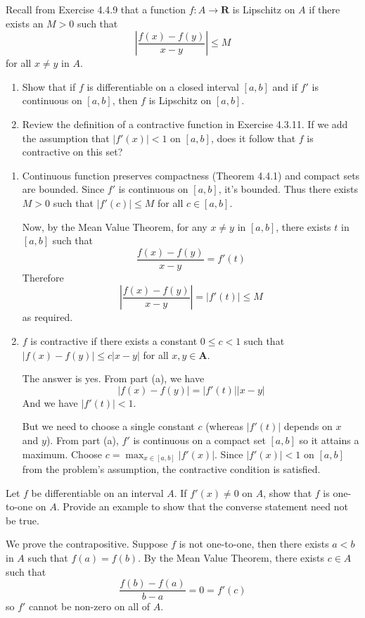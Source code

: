 \documentclass{oxmathproblems}
\begin{document}
\begin{questions}

\miquestion Recall from Exercise 4.4.9 that a function $f: A \to \textbf{R}$ is Lipschitz on $A$ if there exists an $M > 0$ such that
\[\left|\frac{f(x)-f(y)}{x-y}\right| \leq M\]
for all $x \neq y$ in $A$.
\begin{enumerate}[label=(\alph*)]
  \item Show that if $f$ is differentiable on a closed interval $[a, b]$ and if $f'$ is continuous on $[a, b]$, then $f$ is Lipschitz on $[a, b]$.
  \item Review the definition of a contractive function in Exercise 4.3.11. If we add the assumption that $|f'(x)| < 1$ on $[a, b]$, does it follow that $f$ is
  contractive on this set?
\end{enumerate}

\begin{solution}
  \begin{enumerate}[label=(\alph*)]
    \item Continuous function preserves compactness (Theorem 4.4.1) and compact sets are bounded. Since $f'$ is continuous on $[a, b]$, it's bounded.
    Thus there exists $M > 0$ such that $|f'(c)| \leq M$ for all $c \in [a, b]$.

    Now, by the Mean Value Theorem, for any $x \neq y$ in $[a, b]$, there exists $t$ in $[a, b]$ such that
    \[\frac{f(x)-f(y)}{x-y} = f'(t)\] 
    Therefore
    \[\left|\frac{f(x)-f(y)}{x-y}\right| = |f'(t)| \leq M\]
    as required.

    \item $f$ is contractive if there exists a constant $0 \leq c < 1$ such that $|f(x)-f(y)| \leq c|x-y|$ for all $x, y \in \textbf{A}$.
    
    The answer is yes. From part (a), we have
    \[\left|f(x)-f(y)\right| = |f'(t)||x-y|\]
    And we have $|f'(t)| < 1$.
    
    But we need to choose a single constant $c$ (whereas $|f'(t)|$ depends on $x$ and $y$). From part (a), $f'$ is continuous on a compact
    set $[a, b]$ so it attains a maximum. Choose $c = \max_{x \in [a,b]}|f'(x)|$. Since $|f'(x)| < 1$ on $[a, b]$ from the problem's assumption, the contractive condition
    is satisfied.
  \end{enumerate}
\end{solution}

\miquestion Let $f$ be differentiable on an interval $A$. If $f'(x) \neq 0$ on $A$, show that $f$ is one-to-one on $A$. Provide an example to show that the converse statement
need not be true.
\begin{solution}
  We prove the contrapositive. Suppose $f$ is not one-to-one, then there exists $a < b$ in $A$ such that $f(a)=f(b)$. By the Mean Value Theorem, there exists $c \in A$ such that
  \[\frac{f(b)-f(a)}{b-a} = 0 = f'(c)\]
  so $f'$ cannot be non-zero on all of $A$.


\end{solution}
\end{questions}
\end{document}
